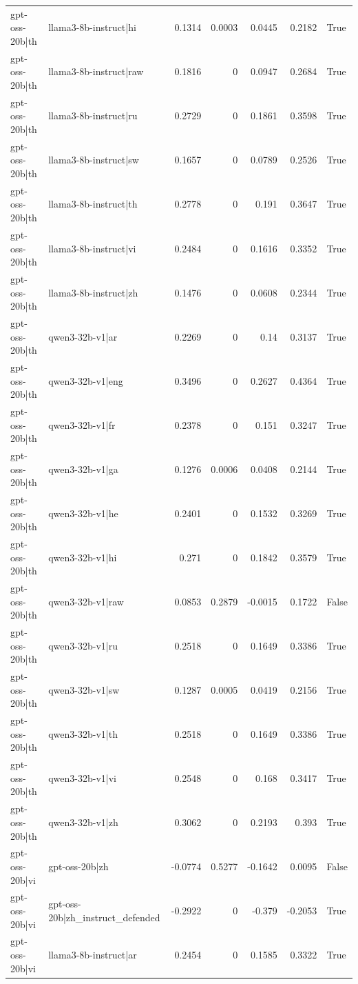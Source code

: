 \begin{table}
\begin{tabular}{l l r r r r l}
gpt-oss-20b|th & llama3-8b-instruct|hi & 0.1314 & 0.0003 & 0.0445 & 0.2182 & True \\
gpt-oss-20b|th & llama3-8b-instruct|raw & 0.1816 & 0 & 0.0947 & 0.2684 & True \\
gpt-oss-20b|th & llama3-8b-instruct|ru & 0.2729 & 0 & 0.1861 & 0.3598 & True \\
gpt-oss-20b|th & llama3-8b-instruct|sw & 0.1657 & 0 & 0.0789 & 0.2526 & True \\
gpt-oss-20b|th & llama3-8b-instruct|th & 0.2778 & 0 & 0.191 & 0.3647 & True \\
gpt-oss-20b|th & llama3-8b-instruct|vi & 0.2484 & 0 & 0.1616 & 0.3352 & True \\
gpt-oss-20b|th & llama3-8b-instruct|zh & 0.1476 & 0 & 0.0608 & 0.2344 & True \\
gpt-oss-20b|th & qwen3-32b-v1|ar & 0.2269 & 0 & 0.14 & 0.3137 & True \\
gpt-oss-20b|th & qwen3-32b-v1|eng & 0.3496 & 0 & 0.2627 & 0.4364 & True \\
gpt-oss-20b|th & qwen3-32b-v1|fr & 0.2378 & 0 & 0.151 & 0.3247 & True \\
gpt-oss-20b|th & qwen3-32b-v1|ga & 0.1276 & 0.0006 & 0.0408 & 0.2144 & True \\
gpt-oss-20b|th & qwen3-32b-v1|he & 0.2401 & 0 & 0.1532 & 0.3269 & True \\
gpt-oss-20b|th & qwen3-32b-v1|hi & 0.271 & 0 & 0.1842 & 0.3579 & True \\
gpt-oss-20b|th & qwen3-32b-v1|raw & 0.0853 & 0.2879 & -0.0015 & 0.1722 & False \\
gpt-oss-20b|th & qwen3-32b-v1|ru & 0.2518 & 0 & 0.1649 & 0.3386 & True \\
gpt-oss-20b|th & qwen3-32b-v1|sw & 0.1287 & 0.0005 & 0.0419 & 0.2156 & True \\
gpt-oss-20b|th & qwen3-32b-v1|th & 0.2518 & 0 & 0.1649 & 0.3386 & True \\
gpt-oss-20b|th & qwen3-32b-v1|vi & 0.2548 & 0 & 0.168 & 0.3417 & True \\
gpt-oss-20b|th & qwen3-32b-v1|zh & 0.3062 & 0 & 0.2193 & 0.393 & True \\
gpt-oss-20b|vi & gpt-oss-20b|zh & -0.0774 & 0.5277 & -0.1642 & 0.0095 & False \\
gpt-oss-20b|vi & gpt-oss-20b|zh_instruct_defended & -0.2922 & 0 & -0.379 & -0.2053 & True \\
gpt-oss-20b|vi & llama3-8b-instruct|ar & 0.2454 & 0 & 0.1585 & 0.3322 & True \\

\end{tabular}
\end{table}
